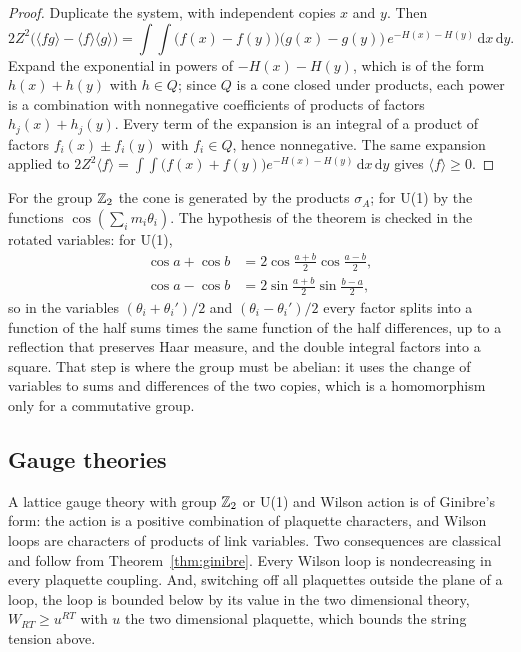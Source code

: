 \begin{proof}
Duplicate the system, with independent copies $x$ and $y$. Then
\[
2Z^2\big(\langle fg\rangle-\langle f\rangle\langle g\rangle\big)=\int\!\!\int\big(f(x)-f(y)\big)\big(g(x)-g(y)\big)\,e^{-H(x)-H(y)}\,\mathrm dx\,\mathrm dy .
\]
Expand the exponential in powers of $-H(x)-H(y)$, which is of the form $h(x)+h(y)$ with $h\in Q$; since $Q$ is a cone closed under products, each power is a combination with nonnegative coefficients of products of factors $h_j(x)+h_j(y)$. Every term of the expansion is an integral of a product of factors $f_i(x)\pm f_i(y)$ with $f_i\in Q$, hence nonnegative. The same expansion applied to $2Z^2\langle f\rangle=\int\!\!\int\big(f(x)+f(y)\big)e^{-H(x)-H(y)}\,\mathrm dx\,\mathrm dy$ gives $\langle f\rangle\ge0$.
\end{proof}

For the group $\mathbb{Z}_2$ the cone is generated by the products $\sigma_A$; for U(1) by the functions $\cos(\sum_im_i\theta_i)$. The hypothesis of the theorem is checked in the rotated variables: for U(1),
\begin{align*}
\cos a+\cos b&=2\cos\frac{a+b}{2}\cos\frac{a-b}{2},\\
\cos a-\cos b&=2\sin\frac{a+b}{2}\sin\frac{b-a}{2},
\end{align*}
so in the variables $(\theta_i+\theta_i')/2$ and $(\theta_i-\theta_i')/2$ every factor splits into a function of the half sums times the same function of the half differences, up to a reflection that preserves Haar measure, and the double integral factors into a square. That step is where the group must be abelian: it uses the change of variables to sums and differences of the two copies, which is a homomorphism only for a commutative group.

\subsection{Gauge theories}

A lattice gauge theory with group $\mathbb{Z}_2$ or U(1) and Wilson action is of Ginibre's form: the action is a positive combination of plaquette characters, and Wilson loops are characters of products of link variables. Two consequences are classical and follow from Theorem~\ref{thm:ginibre}. Every Wilson loop is nondecreasing in every plaquette coupling. And, switching off all plaquettes outside the plane of a loop, the loop is bounded below by its value in the two dimensional theory, $W_{RT}\ge u^{RT}$ with $u$ the two dimensional plaquette, which bounds the string tension above.

